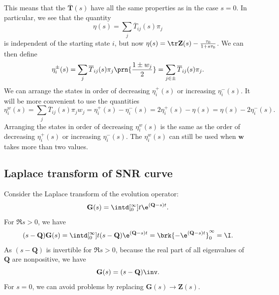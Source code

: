 \documentclass[12pt]{article}
\newcommand{\MMm}{Q}
\newcommand{\MM}{\mathbf{\MMm}}
\newcommand{\eqm}{\pi}
\newcommand{\fptm}{T}
\newcommand{\fpt}{\mathbf{\fptm}}
\newcommand{\fptbm}{\overline{\fptm}}
\newcommand{\fptb}{\overline{\fpt}}
\newcommand{\fundm}{Z}
\newcommand{\fund}{\mathbf{\fundm}}
\newcommand{\etwm}{\eta^w}
\newcommand{\wm}{w}
\newcommand{\w}{\mathbf{\wm}}
\begin{document}
This means that the \( \fptb(s) \) have all the same properties as in the case \(s=0\).
In particular, we see that the quantity
%
\begin{equation}\label{eq:lkemeny}
  \eta(s) = \sum_j \fptbm_{ij}(s) \eqm_j
\end{equation}
%
is independent of the starting state \(i\), but now \(\eta(s) = \tr\fund(s) - \frac{\tau_0}{1 + s \tau_0}\).
We can then define
%
\begin{equation}\label{eq:lpmixtime}
  \eta^{\pm}_i(s) = \sum_j \fptbm_{ij}(s) \eqm_j \prn{\frac{1 \pm \wm_j}{2}} 
      =  \sum_{j\in \pm} \fptbm_{ij}(s) \eqm_j.
\end{equation}
%
We can arrange the states in order of decreasing \(\eta^{+}_i(s)\) or increasing \(\eta^{-}_i(s)\).
It will be more convenient to use the quantities
%
\begin{equation}\label{eq:lwpmixtime}
  \etwm_i(s) = \sum_j \fptbm_{ij}(s)\eqm_j \wm_j
    = \eta^+_i(s) - \eta^-_i(s) 
    = 2\eta^+_i(s) - \eta(s) 
    = \eta(s) - 2\eta^-_i(s) .
\end{equation}
%
Arranging the states in order of decreasing \(\etwm_i(s)\) is the same as the order of decreasing \(\eta^{+}_i(s)\) or increasing \(\eta^{-}_i(s)\).
The \(\etwm_i(s)\) can still be used when \(\w\) takes more than two values.


\subsection{Laplace transform of SNR curve}\label{sec:laplaceSNR}

Consider the Laplace transform of the evolution operator:
%
\begin{equation}\label{eq:levol}
  \mathbf{G}(s) = \intd[_0^{\infty}]{t} \e^{(\MM-s) t}.
\end{equation}
%
For \(\Re s>0\), we have
%
\begin{equation}\label{eq:levolcalc}
  (s-\MM)\mathbf{G}(s) = \intd[_0^{\infty}]{t} (s-\MM)\e^{(\MM-s) t} = \brk{-\e^{(\MM-s) t}}_0^{\infty} = \I.
\end{equation}
%
As \((s-\MM)\) is invertible for \(\Re s>0\), because the real part of all eigenvalues of \(\MM\) are nonpositive, we have
%
\begin{equation}\label{eq:levolres}
  \mathbf{G}(s) = (s-\MM)\inv.
\end{equation}
%
For \(s=0\), we can avoid problems by replacing \(\mathbf{G}(s) \to \fund(s)\).
\end{document}

